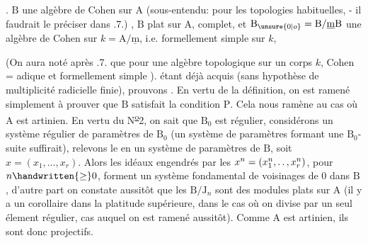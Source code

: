 
.   $\mathrm B$  une algèbre de Cohen sur $\mathrm A$ (sous-entendu: pour les topologies habituelles, - il faudrait le préciser dans .7.) ,  $\mathrm B$  plat sur $\mathrm A$, complet, et  $\mathrm B_{\unsure{0|o}}=\mathrm B/\underline{\mathrm m}\mathrm B$  une algèbre de Cohen sur $k=\mathrm A/\underline{\mathrm m}$, i.e. formellement simple sur $k$,  

(On aura noté  après .7. que pour une algèbre topologique sur un corps $k$, Cohen = adique et formellement simple ).  étant déjà acquis (sans hypothèse de multiplicité radicielle finie), prouvons . En vertu de la définition, on est ramené simplement à prouver que $\mathrm B$ satisfait la condition $\mathrm P$. Cela nous ramène au cas où $\mathrm A$ est artinien. En vertu du N\textsuperscript{\uline{o}}2, on sait que $\mathrm B_0$ est régulier, considérons un système régulier de paramètres de $\mathrm B_0$ (un système de paramètres formant une $\mathrm B_0$-suite suffirait), relevons le en un système de paramètres de $\mathrm B$, soit $x=(x_1,\ldots,x_r)$. Alors les idéaux engendrés par les $x^n=(x_1^n,\ldotp\ldotp,x_r^n)$, pour $n\handwritten{\geq}0$, forment un système fondamental de voisinages  de 0  dans $\mathrm B$, d'autre part on constate aussitôt que les $\mathrm B/\mathrm J_n$ sont des modules plats sur $\mathrm A$ (il y a un  corollaire dans la platitude supérieure, dans le cas où on divise par un seul élement  régulier, cas auquel on est ramené aussitôt). Comme $\mathrm A$ est artinien, ils sont donc projectifs.  

